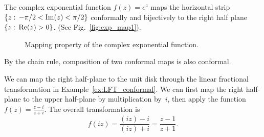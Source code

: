 \begin{example}
	The complex exponential function $f(z)=e^z$ maps the horizontal strip $\{z:\, -\pi / 2 < \operatorname{\mathrm{Im}}(z) < \pi/ 2\}$ conformally and bijectively to the right half plane $\{z:\, \operatorname{\mathrm{Re}}(z) > 0\}$. 
 (See Fig.~\ref{fig:exp_map1}). 
\end{example}

\begin{figure}
\begin{center}
\end{center} 
	\caption{Mapping property of the complex exponential function.}
\label{fig:exp_map2}
\end{figure}


By the chain rule, composition of two conformal maps is also conformal. 

\begin{example}
We can map the right half-plane to the unit disk through the linear fractional transformation in Example~\ref{ex:LFT_conformal}. We can first map the right half-plane to the upper half-plane  by multiplication by~$i$, then apply the function $f(z) = \frac{z-i}{z+i}$. The overall transformation is
$$
f(iz) = \frac{(iz) - i}{(iz) + i} = \frac{z-1}{z+1}.
$$
\end{example}

